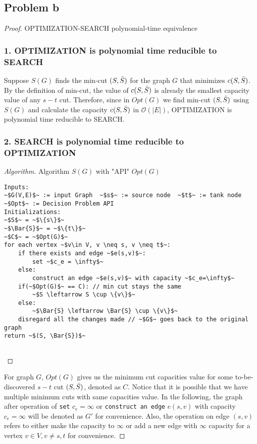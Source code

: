 \documentclass[openany]{article}
\begin{document}
\subsection*{Problem b}
\begin{proof}{}{OPTIMIZATION-SEARCH polynomial-time equivalence}
    
\subsubsection*{1. OPTIMIZATION is polynomial time reducible to SEARCH}
Suppose $S(G)$ finds the min-cut $(S,\Bar{S})$ for the graph $G$ that minimizes $c(S,\Bar{S})$. By the definition of min-cut, the value of $c(S,\Bar{S})$ is already the smallest capacity value of any $s-t$ cut. Therefore, since in $Opt(G)$ we find min-cut $(S,\Bar{S})$ using $S(G)$ and calculate the capacity $c(S,\Bar{S})$ in $\mathcal{O}(|E|)$,  OPTIMIZATION is polynomial time reducible to SEARCH.

\subsubsection*{2. SEARCH is polynomial time reducible to OPTIMIZATION} 
\begin{proof}[Algorithm]{}
		\renewcommand{\qedsymbol}{}
		Algorithm $S(G)$ with "API" $Opt(G)$
		\begin{lstlisting}[basicstyle=\fontsize{8}{9}\selectfont\ttfamily]
Inputs:
~$G(V,E)$~ := input Graph  ~$s$~ := source node  ~$t$~ := tank node
~$Opt$~ := Decision Problem API
Initializations:
~$S$~ = ~$\{s\}$~
~$\Bar{S}$~ = ~$\{t\}$~
~$C$~ = ~$Opt(G)$~
for each vertex ~$v\in V, v \neq s, v \neq t$~:
    if there exists and edge ~$e(s,v)$~:
        set ~$c_e = \infty$~
    else:
        construct an edge ~$e(s,v)$~ with capacity ~$c_e=\infty$~
    if(~$Opt(G)$~ == C): // min cut stays the same
        ~$S \leftarrow S \cup \{v\}$~
    else:
        ~$\Bar{S} \leftarrow \Bar{S} \cup \{v\}$~
    disregard all the changes made // ~$G$~ goes back to the original graph
return ~$(S, \Bar{S})$~
    
		\end{lstlisting} 
\end{proof}
For graph $G$, $Opt(G)$ gives us the minimum cut capacities value for some to-be-discovered $s-t$ cut $(S, \Bar{S})$, denoted as $C$. Notice that it is possible that we have multiple minimum cuts with same capacities value. In the following, the graph after operation of \texttt{set} $c_e = \infty$ or \texttt{construct an edge} $e(s,v)$ with capacity $c_e = \infty$ will be denoted as $G'$ for convenience. Also, the operation on edge $(s,v)$ refers to either make the capacity to $\infty$ or add a new edge with $\infty$ capacity for a vertex $v\in V, v\neq s, t$ for convenience.


\end{proof}
\end{document}
